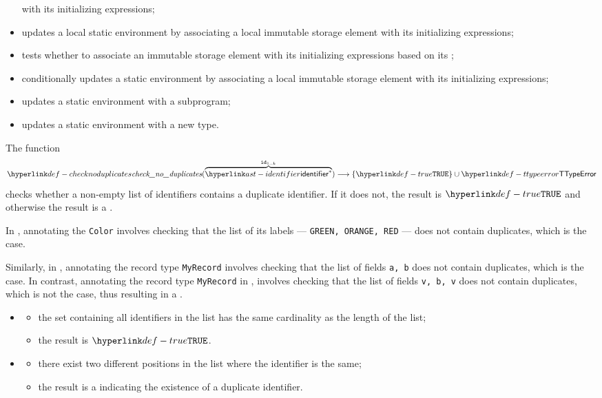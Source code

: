 \begin{itemize}
        with its initializing expressions;
  \item {} updates a local static environment by associating a local immutable storage element
        with its initializing expressions;
  \item {} tests whether to associate an immutable storage element
        with its initializing expressions based on its \sideeffectdescriptorsetsterm;
  \item {} conditionally updates a static environment by associating
        a local immutable storage element with its initializing expressions;
  \item {} updates a static environment with a subprogram;
  \item {} updates a static environment with a new type.
\end{itemize}

\hypertarget{def-checknoduplicates}{}
The function
\[
  \checknoduplicates(\overname{\identifier^*}{\id_{1..k}}) \aslto \{\True\} \cup \TTypeError
\]
checks whether a non-empty list of identifiers contains a duplicate identifier. If it does not, the result
is $\True$ and otherwise the result is a \typingerrorterm{}.

In , annotating the \enumerationtypeterm{} \verb|Color|
involves checking that the list of its labels --- \verb|GREEN, ORANGE, RED| --- does not contain duplicates,
which is the case.

Similarly, in , annotating the record type \verb|MyRecord|
involves checking that the list of fields \verb|a, b| does not contain duplicates, which is the case.
In contrast, annotating the record type \verb|MyRecord| in ,
involves checking that the list of fields \verb|v, b, v| does not contain duplicates, which is not the case,
thus resulting in a \typingerrorterm.

\ProseParagraph
\OneApplies
\begin{itemize}
  \item {}
  \begin{itemize}
    \item the set containing all identifiers in the list has the same cardinality as the length of the list;
    \item the result is $\True$.
  \end{itemize}

  \item {}
  \begin{itemize}
    \item there exist two different positions in the list where the identifier is the same;
    \item the result is a \typingerrorterm{} indicating the existence of a duplicate identifier.
  \end{itemize}
\end{itemize}

